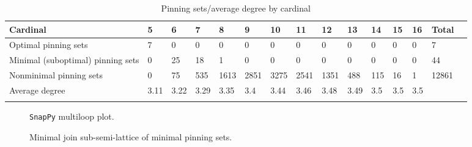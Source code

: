 \documentclass{article}%
\begin{document}
\begin{table}[ht]
	\caption{Pinning sets/average degree by cardinal}
	\centering
	\renewcommand{\arraystretch}{1.5}
	\begin{tabularx}{\textwidth}{lXXXXXXXXXXXXXX}
		\toprule
			Cardinal & 5 & 6 & 7 & 8 & 9 & 10 & 11 & 12 & 13 & 14 & 15 & 16 & Total\\
			\hline
			Optimal pinning sets & 7 & 0 & 0 & 0 & 0 & 0 & 0 & 0 & 0 & 0 & 0 & 0 & 7 \\
			Minimal (suboptimal) pinning sets & 0 & 25 & 18 & 1 & 0 & 0 & 0 & 0 & 0 & 0 & 0 & 0 & 44 \\
			Nonminimal pinning sets & 0 & 75 & 535 & 1613 & 2851 & 3275 & 2541 & 1351 & 488 & 115 & 16 & 1 & 12861 \\
			Average degree & 3.11 & 3.22 & 3.29 & 3.35 & 3.4 & 3.44 & 3.46 & 3.48 & 3.49 & 3.5 & 3.5 & 3.5 &  \\
		\bottomrule \\ 
	\end{tabularx}
\end{table}

\begin{multicols}{2}
\begin{figure}[H]
\centering

\caption{\texttt{SnapPy} multiloop plot.}
\label{fig:tex/img/[[11, 28, 12, 1], [10, 17, 11, 18], [6, 27, 7, 28], [12, 7, 13, 8], [1, 19, 2, 18], [2, 9, 3, 10], [16, 23, 17, 24], [5, 22, 6, 23], [26, 13, 27, 14], [8, 20, 9, 19], [3, 25, 4, 24], [4, 15, 5, 16], [.svg}
\end{figure}
\columnbreak

\begin{figure}[H]
\centering
\scalebox{0.8}{}
\caption{Minimal join sub-semi-lattice of minimal pinning sets.}
\label{fig:tex/img/[[11, 28, 12, 1], [10, 17, 11, 18], [6, 27, 7, 28], [12, 7, 13, 8], [1, 19, 2, 18], [2, 9, 3, 10], [16, 23, 17, 24], [5, 22, 6, 23], [26, 13, 27, 14], [8, 20, 9, 19], [3, 25, 4, 24], [4, 15, 5, 16], [.pgf}
\end{figure}
\end{multicols}
\end{document}
